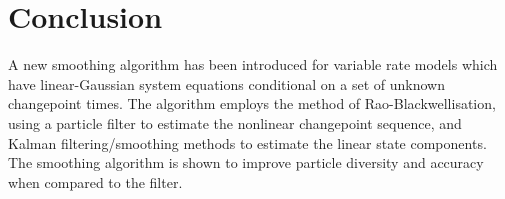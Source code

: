 \documentclass[journal]{IEEEtran}
\begin{document}
%





\section{Conclusion}
A new smoothing algorithm has been introduced for variable rate models which have linear-Gaussian system equations conditional on a set of unknown changepoint times. The algorithm employs the method of Rao-Blackwellisation, using a particle filter to estimate the nonlinear changepoint sequence, and Kalman filtering/smoothing methods to estimate the linear state components. The smoothing algorithm is shown to improve particle diversity and accuracy when compared to the filter.





\end{document}
